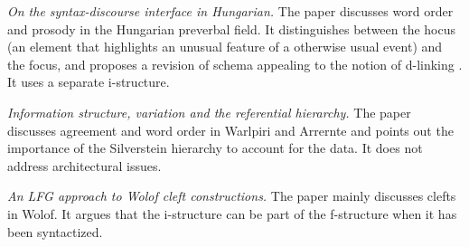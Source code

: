 \documentclass[output=paper,hidelinks]{langscibook}
\begin{document}
\vspace{+6pt}
\citet{GazdikKomlosy2011} \textit{On the syntax-discourse interface in Hungarian.} The paper discusses word order and prosody in the Hungarian preverbal field. It distinguishes between the hocus (an element that highlights an unusual feature of a otherwise usual event) and the focus, and proposes a revision of  schema appealing to the notion of d-linking \citep{Pesetsky}. It uses a separate i-structure. 

 
\vspace{+6pt}
\citet{Simpson2012} \textit{Information structure, variation and the referential hierarchy. }The paper discusses agreement and word order in Warlpiri and Arrernte and points out the importance of the Silverstein hierarchy to account for the data. It does not address architectural issues.  


\vspace{+6pt}
\citet{Dione12} \textit{An LFG approach to Wolof cleft constructions.} The paper mainly discusses clefts in Wolof. It argues that the i-structure can be part of the f-struc\-ture when it has been syntactized.
\end{document}
